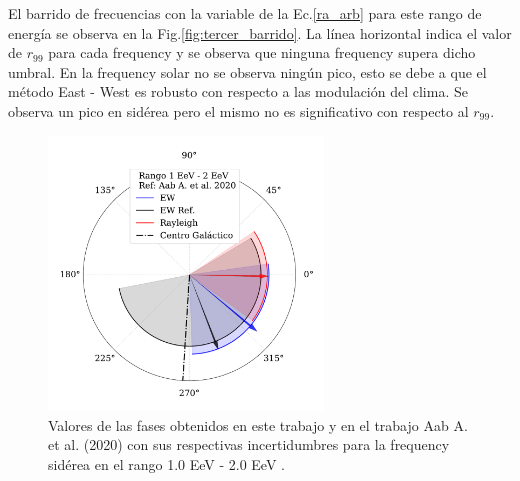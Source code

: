 \documentclass[12pt, doublespace, oneside]{article}
\begin{document}
    El barrido de frecuencias con la variable de la Ec.\ref{ra_arb} para este rango de energía se observa en la Fig.\ref{fig:tercer_barrido}. La línea horizontal indica el valor de $r_{99}$ para cada frequency y se observa que ninguna frequency supera dicho umbral. En la frequency solar no se observa ningún pico, esto se debe a que el método East - West es robusto con respecto a las modulación del clima. Se observa un pico en sidérea pero el mismo no es significativo con respecto al $r_{99}$.


    \begin{figure}[H]
        \begin{small}
            \begin{center}
                \vspace*{-0.65 cm}
                \includegraphics[width=0.65\textwidth]{Figs/phase_tercer_bin_v3.pdf}
                \vspace*{-1.2 cm}
            \end{center}
        \caption{Valores de las fases obtenidos en este trabajo y en el trabajo Aab A. et al. (2020) \cite{Aab_2020} con sus respectivas incertidumbres para la frequency sidérea en el  rango 1.0 EeV - 2.0 EeV .}
        \label{fig:tercer}
        \end{small}
    \end{figure}
\end{document}
